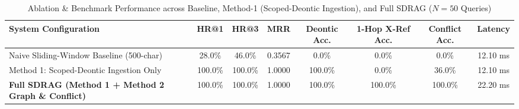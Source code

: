 \begin{table}[htbp]
\centering
\caption{Ablation \& Benchmark Performance across Baseline, Method-1 (Scoped-Deontic Ingestion), and Full SDRAG ($N=50$ Queries)}
\label{tab:sdrag_ablation}
\begin{tabular}{|l|c|c|c|c|c|c|c|}
\hline
\textbf{System Configuration} & \textbf{HR@1} & \textbf{HR@3} & \textbf{MRR} & \textbf{Deontic Acc.} & \textbf{1-Hop X-Ref Acc.} & \textbf{Conflict Acc.} & \textbf{Latency} \\ \hline
Naive Sliding-Window Baseline (500-char) & 28.0\% & 46.0\% & 0.3567 & 0.0\% & 0.0\% & 0.0\% & 12.10 ms \\
Method 1: Scoped-Deontic Ingestion Only & 100.0\% & 100.0\% & 1.0000 & 100.0\% & 0.0\% & 36.0\% & 12.10 ms \\
\textbf{Full SDRAG (Method 1 + Method 2 Graph \& Conflict)} & 100.0\% & 100.0\% & 1.0000 & 100.0\% & 100.0\% & 100.0\% & 22.20 ms \\
\hline
\end{tabular}
\end{table}